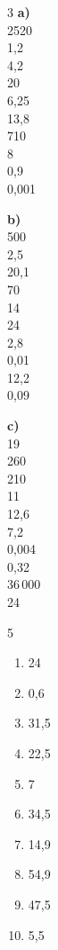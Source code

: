 \vspace{-5pt}
\vspace{-15pt}\begin{multicols}{3}
\textbf{a)}\\
2520\\
1,2\\
4,2\\
20\\
6,25\\
13,8\\
710\\
8\\
0,9\\
0,001

\textbf{b)}\\
 500\\
 2,5\\
 20,1\\
 70\\
 14\\
 24\\
 2,8\\
 0,01\\
 12,2\\
0,09

\textbf{c)}\\
19\\
260\\
210\\
11\\
12,6\\
7,2\\
0,004\\
0,32\\
36\,000\\
24\\
\end{multicols}

\vspace{-5pt}
\vspace{-15pt}\begin{multicols}{5}
\begin{enumerate}[leftmargin=*,align=parleft, label=\alph*)]
\item 24
\item 0,6
\item 31,5 
\item 22,5 
\item 7  
\item 34,5  
\item 14,9
\item 54,9 
\item 47,5 
\item 5,5
\end{enumerate}
\end{multicols}

